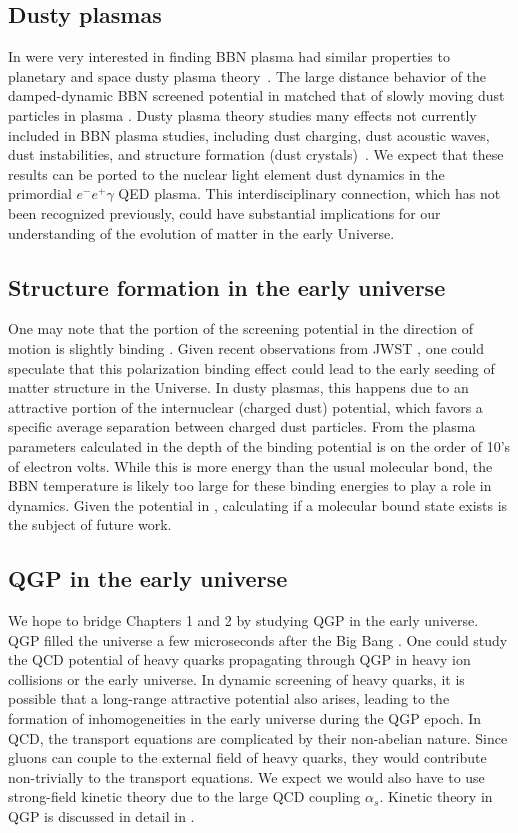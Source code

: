 \subsection{Dusty plasmas}
In \cite{Grayson:2023flr} were very interested in finding BBN plasma had similar properties to planetary and space dusty plasma theory~\cite{Montgomery:1970jpp, Stenflo:1973, Shukla:2002ppcf, Lampe:2000pop}. The large distance behavior of the damped-dynamic BBN screened potential in  matched that of slowly moving dust particles in plasma \cite{Stenflo:1973}. Dusty plasma theory studies many effects not currently included in BBN plasma studies, including dust charging, dust acoustic waves, dust instabilities, and structure formation (dust crystals)~\cite{Shukla:2002ppcf}. We expect that these results can be ported to the nuclear light element dust dynamics in the primordial $e^-e^+\gamma$ QED plasma. This interdisciplinary connection, which has not been recognized previously, could have substantial implications for our understanding of the evolution of matter in the early Universe.

\subsection{Structure formation in the early universe}
One may note that the portion of the screening potential in the direction of motion is slightly binding .
Given recent observations from JWST \cite{ferreira2023jwst}, one could speculate that this polarization binding effect could lead to the early seeding of matter structure in the Universe. In dusty plasmas, this happens due to an attractive portion of the internuclear (charged dust) potential, which favors a specific average separation between charged dust particles. From the plasma parameters calculated in \cite{Grayson:2023flr} the depth of the binding potential is on the order of 10's of electron volts. While this is more energy than the usual molecular bond, the BBN temperature is likely too large for these binding energies to play a role in dynamics. Given the potential in , calculating if a molecular bound state exists is the subject of future work.
\subsection{QGP in the early universe}
We hope to bridge Chapters 1 and 2 by studying QGP in the early universe. QGP filled the universe a few microseconds after the Big Bang \cite{rafelski2013connecting}. One could study the QCD potential of heavy quarks propagating through QGP in heavy ion collisions or the early universe. In dynamic screening of heavy quarks, it is possible that a long-range attractive potential also arises, leading to the formation of inhomogeneities in the early universe during the QGP epoch. In QCD, the transport equations are complicated by their non-abelian nature. Since gluons can couple to the external field of heavy quarks, they would contribute non-trivially to the transport equations. We expect we would also have to use strong-field kinetic theory due to the large QCD coupling $\alpha_s$. Kinetic theory in QGP is discussed in detail in \cite{MROWCZYNSKI20171}.

